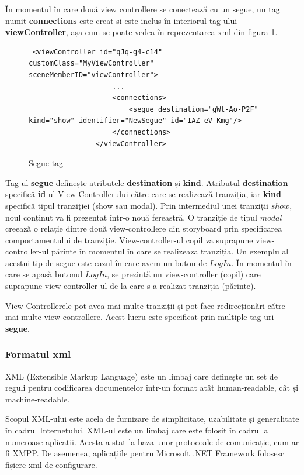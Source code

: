 În momentul în care două view controllere se conectează cu un segue, un tag numit \textbf{connections} este creat și este inclus în interiorul tag-ului \textbf{viewController}, așa cum se poate vedea în reprezentarea xml din figura \ref{fig:segueXML}.

\begin{figure}[!htbp]
\lstset{language=XML}
\begin{lstlisting}
 <viewController id="qJq-g4-c14" customClass="MyViewController" sceneMemberID="viewController">
                    ...
                    <connections>
                        <segue destination="gWt-Ao-P2F" kind="show" identifier="NewSegue" id="IAZ-eV-Kmg"/>
                    </connections>
                </viewController>
\end{lstlisting}
\caption{Segue tag}\label{fig:segueXML}
\end{figure}

Tag-ul \textbf{segue} definește atributele \textbf{destination} și \textbf{kind}. Atributul \textbf{destination} specifică \textbf{id}-ul View Controllerului către care se realizează tranziția, iar \textbf{kind} specifică tipul tranziției (show sau modal). Prin intermediul unei tranziții $show$, noul conținut va fi prezentat într-o nouă fereastră. O tranziție de tipul $modal$ creează o relație dintre două view-controllere din storyboard prin specificarea comportamentului de tranziție. View-controller-ul copil va suprapune view-controller-ul părinte în momentul în care se realizează tranziția. Un exemplu al acestui tip de segue este cazul în care avem un buton de $Log In$. În momentul în care se apasă butonul $Log In$, se prezintă un view-controller (copil) care suprapune view-controller-ul de la care s-a realizat tranziția (părinte). 

View Controllerele pot avea mai multe tranziții și pot face redirecționări către mai multe view controllere. Acest lucru este specificat prin multiple tag-uri \textbf{segue}.

\subsubsection{Formatul xml}

XML (Extensible Markup Language) este un limbaj care definește un set de reguli pentru codificarea documentelor într-un format atât human-readable, cât și machine-readable. 

Scopul XML-ului este acela de furnizare de simplicitate, uzabilitate și generalitate în cadrul Internetului. XML-ul este un limbaj care este folosit în cadrul a numeroase aplicații. Acesta a stat la baza unor protocoale de comunicație, cum ar fi XMPP. De asemenea, aplicațiile pentru Microsoft .NET Framework folosesc fișiere xml de configurare. 


